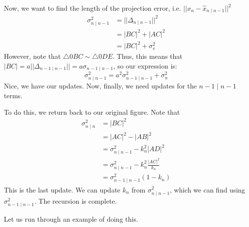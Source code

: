 \begin{theorem}
\begin{proof*}
        Now, we want to find the length of the projection error, i.e. $||x_n - \hat{x}_{n \mid n - 1}||^2$ 
        \begin{align*}
            \sigma_{n \mid n - 1}^2 &= || \Delta_{n \mid n - 1} ||^2 \\
            &= |BC|^2 + |AC|^2 \\
            &= |BC|^2 + \sigma_v^2
        \end{align*}
        However, note that $\triangle 0BC \sim \triangle 0DE$. Thus, this means that $|BC| = a ||\Delta_{n - 1 \mid n - 1}|| = a \sigma_{n - 1 \mid n - 1}$,
        so our expression is:
        \[ \sigma_{n \mid n - 1}^2 = a^2 \sigma_{n - 1 \mid n - 1}^2 + \sigma_u^2 \]
        Nice, we have our updates. Now, finally, we need updates for the $n - 1 \mid n - 1$ terms.

        To do this, we return back to our original figure. Note that 
        \begin{align*}
            \sigma_{n \mid n}^2 &= |BC|^2 \\
            &= |AC|^2 - |AB|^2 \\
            &= \sigma_{n \mid n - 1}^2 - k_n^2 |AD|^2 \\
            &= \sigma_{n \mid n - 1}^2 - k_n^2 \frac{|AC|^2}{k_n} \\
            &= \sigma_{n - 1 \mid n - 1}^2 (1 - k_n)
        \end{align*}
        This is the last update. We can update $k_n$ from $\sigma_{n \mid n - 1}^2$, which we can find using $\sigma_{n - 1 \mid n - 1}^2$.
        The recursion is complete.
    \end{proof*}
\end{theorem}

Let us run through an example of doing this.

